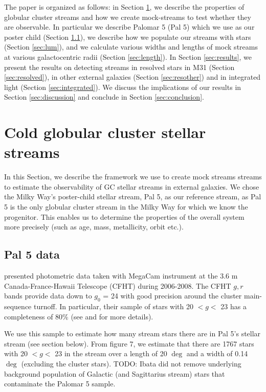 \documentclass[twocolumn]{aastex62}
\newcommand{\todo}[1]{{\color{red} TODO: #1}}
\begin{document}
The paper is organized as follows: in Section \ref{sec:coldstreams}, we describe the properties of globular cluster streams and how we create mock-streams to test whether they are observable. In particular we describe Palomar 5 (Pal 5) which we use as our poster child (Section \ref{sec:pal5}), we describe how we populate our streams with stars (Section \ref{sec:lum}), and we calculate various widths and lengths of mock streams at various galactocentric radii (Section \ref{sec:length}). In Section \ref{sec:results}, we present the results on detecting streams in resolved stars in M31 (Section \ref{sec:resolved}), in other external galaxies (Section \ref{sec:resother}) and in integrated light (Section \ref{sec:integrated}). We discuss the implications of our results in Section \ref{sec:discussion} and conclude in Section \ref{sec:conclusion}.
%

\section{Cold globular cluster stellar streams}
\label{sec:coldstreams}
In this Section, we describe the framework we use to create mock streams streams to estimate the observability of GC stellar streams in external galaxies. We chose the Milky Way's poster-child stellar stream, Pal 5,  as our reference stream, as Pal 5 is the only globular cluster stream in the Milky Way for which we know the progenitor. This enables us to determine the properties of the overall system more precisely (such as age, mass, metallicity, orbit etc.). 

\subsection{Pal 5 data}
\label{sec:pal5}
 \citet{ibata16} presented photometric data taken with MegaCam instrument at the 3.6 m Canada-France-Hawaii Telescope (CFHT) during 2006-2008. The CFHT $g, r$ bands provide data down to $g_0$ = 24 with good precision around the cluster main-sequence turnoff. In particular, their sample of stars with 20 $< g <$ 23 has a completeness of 80\% (see \citealt{ibata16} and \citealt{ibata17} for more details). 
 
We use this sample to estimate how many stream stars there are in Pal 5's stellar stream (see section below). From \citet{ibata16} figure 7, we estimate that there are 1767 stars with 20 $< g <$ 23 in the stream over a length of 20 $\deg$  and a width of 0.14 $\deg$  (excluding the cluster stars). \todo{Ibata did not remove underlying background population of Galactic (and Sagittarius stream) stars that contaminate the Palomar 5 sample.}  
\end{document}
